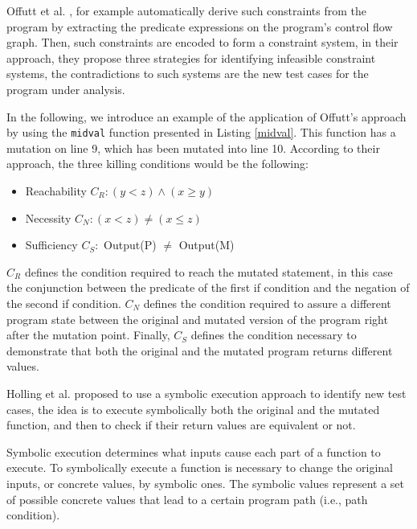 Offutt et al. \cite{offutt1997automatically}, for example automatically derive such constraints from the program by extracting the predicate expressions on the program's control flow graph.
Then, such constraints are encoded to form a constraint system, in their approach, they propose three strategies for identifying infeasible constraint systems, the contradictions to such systems are the new test cases for the program under analysis.



In the following, we introduce an example of the application of Offutt's \cite{offutt1997automatically} approach by using the \texttt{midval} function presented in Listing \ref{midval}. This function has a mutation on line 9, which has been mutated into line 10. According to their approach, the three killing conditions would be the following:

\begin{itemize}
	\item Reachability $C_R: (y < z) \wedge (x \geq y)$
	\item Necessity $C_N: (x < z) \neq (x \leq z)$
	\item Sufficiency $C_S:$ Output(P) $\neq$ Output(M)
\end{itemize}

$C_R$ defines the condition required to reach the mutated statement, in this case the conjunction between the predicate of the first if condition and the negation of the second if condition. $C_N$ defines the condition required to assure a different program state between the original and mutated version of the program right after the mutation point. Finally, $C_S$ defines the condition necessary to demonstrate that both the original and the mutated program returns different values.

Holling et al. \cite{holling2016nequivack} proposed to use a symbolic execution approach to identify new test cases, the idea is to execute symbolically both the original and the mutated function, and then to check if their return values are equivalent or not. 


Symbolic execution determines what inputs cause each part of a function to execute. To symbolically execute a function is necessary to change the original inputs, or concrete values, by symbolic ones. The symbolic values represent a set of possible concrete values that lead to a certain program path (i.e., path condition). 


